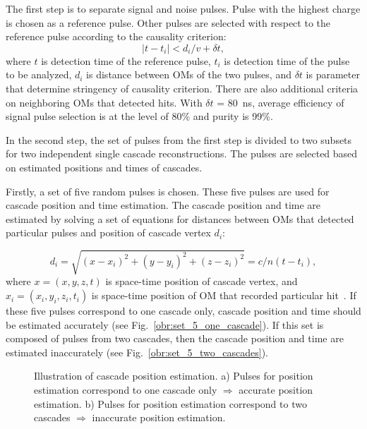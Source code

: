\documentclass[a4paper,11pt]{article}
\begin{document}
The first step is to separate signal and noise pulses. Pulse with the highest charge is chosen as a reference pulse. Other pulses are selected with respect to the reference pulse according to the causality criterion:
\begin{equation}
\mid t-t_{i} \mid <d_{i}/ v + \delta t,
\label{eq:Causality}
\end{equation}
where $t$ is detection time of the reference pulse, $t_{i}$ is detection time of the pulse to be analyzed, $d_{i}$ is distance between OMs of the two pulses, and $\delta t$ is parameter that determine stringency of causality criterion. There are also additional criteria on neighboring OMs that detected hits. With $\delta t$ = 80~ns, average efficiency of signal pulse selection is at the level of 80\% and purity is 99\%.

In the second step, the set of pulses from the first step is divided to two subsets for two independent single cascade reconstructions. The pulses are selected based on estimated positions and times of cascades.

Firstly, a set of five random pulses is chosen. These five pulses are used for cascade position and time estimation. The cascade position and time are estimated by solving a set of equations for distances between OMs that detected particular pulses and position of cascade vertex $d_{i}$:

\begin{equation}
d_{i} = \sqrt{(x-x_{i})^{2}+(y-y_{i})^{2}+(z-z_{i})^{2}} = c/n(t-t_{i}),
\label{eq:estimate_pos_time}
\end{equation}
where $x = (x,y,z,t)$ is space-time position of cascade vertex, and $x_{i} = (x_{i},y_{i},z_{i},t_{i})$ is space-time position of OM that recorded particular hit~\cite{Hartmann:Thesis:2006}. If these five pulses correspond to one cascade only, cascade position and time should be estimated accurately (see Fig.~\ref{obr:set_5_one_cascade}). If this set is composed of pulses from two cascades, then the cascade position and time are estimated inaccurately (see Fig.~\ref{obr:set_5_two_cascades}).

\begin{figure}[h!]
	\centering
	\begin{multicols}{2}
		\centering
		\hspace{0.7cm}
	\hspace{0.7cm}
	\end{multicols}
	\caption{Illustration of cascade position estimation. a) Pulses for position estimation correspond to one cascade only $\Rightarrow$ accurate position estimation. b) Pulses for position estimation correspond to two cascades $\Rightarrow$ inaccurate position estimation.} 
	\label{fig:set_5_illustration}
\end{figure}
\end{document}
